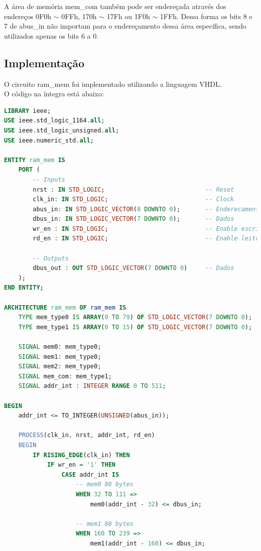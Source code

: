 \documentclass{article}
\begin{document}
A área de memória mem\_com também pode ser endereçada através dos endereços 0F0h $\sim$ 0FFh,
170h $\sim$ 17Fh ou 1F0h $\sim$ 1FFh. Dessa forma os bits 8 e 7 de abus\_in não importam para o endereçamento
dessa área específica, sendo utilizados apenas os bits 6 a 0.

\subsection{Implementação}

O circuito ram\_mem foi implementado utilizando a linguagem VHDL.\\

O código na íntegra está abaixo:\\

\begin{lstlisting}[language=VHDL, caption={Código VHDL fsr\_reg}]
LIBRARY ieee;
USE ieee.std_logic_1164.all;
USE ieee.std_logic_unsigned.all;
USE ieee.numeric_std.all;

ENTITY ram_mem IS
    PORT (
        -- Inputs
        nrst : IN STD_LOGIC;                            -- Reset
        clk_in: IN STD_LOGIC;                           -- Clock
        abus_in: IN STD_LOGIC_VECTOR(8 DOWNTO 0);       -- Enderecamento
        dbus_in: IN STD_LOGIC_VECTOR(7 DOWNTO 0);       -- Dados
        wr_en : IN STD_LOGIC;                           -- Enable escrita
        rd_en : IN STD_LOGIC;                           -- Enable leitura

        -- Outputs
        dbus_out : OUT STD_LOGIC_VECTOR(7 DOWNTO 0)     -- Dados
    );
END ENTITY;

ARCHITECTURE ram_mem OF ram_mem IS
    TYPE mem_type0 IS ARRAY(0 TO 79) OF STD_LOGIC_VECTOR(7 DOWNTO 0);
    TYPE mem_type1 IS ARRAY(0 TO 15) OF STD_LOGIC_VECTOR(7 DOWNTO 0);

    SIGNAL mem0: mem_type0;
    SIGNAL mem1: mem_type0;
    SIGNAL mem2: mem_type0;
    SIGNAL mem_com: mem_type1;
    SIGNAL addr_int : INTEGER RANGE 0 TO 511;

BEGIN
    addr_int <= TO_INTEGER(UNSIGNED(abus_in));

    PROCESS(clk_in, nrst, addr_int, rd_en)
    BEGIN
        IF RISING_EDGE(clk_in) THEN
            IF wr_en = '1' THEN
                CASE addr_int IS 
                    -- mem0 80 bytes
                    WHEN 32 TO 111 =>
                        mem0(addr_int - 32) <= dbus_in;

                    -- mem1 80 bytes
                    WHEN 160 TO 239 =>
                        mem1(addr_int - 160) <= dbus_in;


\end{lstlisting}
\end{document}
